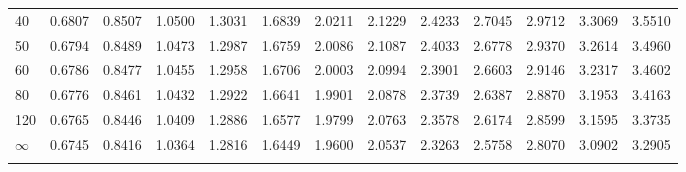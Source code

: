 {\begin{tabular}{l|llllllllllll}
 40 & 0.6807 & 0.8507 & 1.0500 & 1.3031 & 1.6839 & 2.0211 & 2.1229 & 2.4233 & 2.7045 & 2.9712 & 3.3069 & 3.5510 \\[5pt] \arrayrulecolor{light-gray}\hline\arrayrulecolor{black}  
 50 & 0.6794 & 0.8489 & 1.0473 & 1.2987 & 1.6759 & 2.0086 & 2.1087 & 2.4033 & 2.6778 & 2.9370 & 3.2614 & 3.4960 \\[5pt] \arrayrulecolor{light-gray}\hline\arrayrulecolor{black}  
 60 & 0.6786 & 0.8477 & 1.0455 & 1.2958 & 1.6706 & 2.0003 & 2.0994 & 2.3901 & 2.6603 & 2.9146 & 3.2317 & 3.4602 \\[5pt] \arrayrulecolor{light-gray}\hline\arrayrulecolor{black}  
 80 & 0.6776 & 0.8461 & 1.0432 & 1.2922 & 1.6641 & 1.9901 & 2.0878 & 2.3739 & 2.6387 & 2.8870 & 3.1953 & 3.4163 \\[12pt] \arrayrulecolor{light-gray}\hline\arrayrulecolor{black}  
120 & 0.6765 & 0.8446 & 1.0409 & 1.2886 & 1.6577 & 1.9799 & 2.0763 & 2.3578 & 2.6174 & 2.8599 & 3.1595 & 3.3735 \\[5pt] \arrayrulecolor{light-gray}\hline\arrayrulecolor{black}  
$\infty$  & 0.6745 & 0.8416 & 1.0364 & 1.2816 & 1.6449 & 1.9600 & 2.0537 & 2.3263 & 2.5758 & 2.8070 & 3.0902 & 3.2905 \\[5pt] \arrayrulecolor{light-gray}\hline\arrayrulecolor{black}  
\end{tabular}
}

